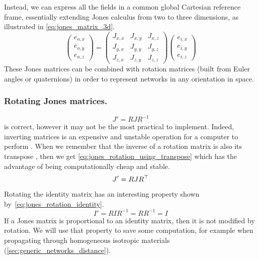 Instead, we can express all the fields in a common global Cartesian reference frame, essentially extending Jones calculus from two to three dimensions, as illustrated in \cref{eq:jones_matrix_3d}.
\begin{equation}
    \begin{pmatrix}
        e_{o, x}\\
        e_{o, y}\\
        e_{o, z}
    \end{pmatrix}
    =
    \begin{pmatrix}
        J_{x, x}   &   J_{x, y}   &   J_{x, z} \\
        J_{y, x}   &   J_{y, y}   &   J_{y, z} \\
        J_{z, x}   &   J_{z, y}   &   J_{z, z}
    \end{pmatrix}
    \begin{pmatrix}
        e_{i, x}\\
        e_{i, y}\\
        e_{i, z}
    \end{pmatrix}
    \label{eq:jones_matrix_3d}
\end{equation}
These Jones matrices can be combined with rotation matrices (built from Euler angles or quaternions) in order to represent networks in any orientation in space.

\subsubsection{Rotating Jones matrices.}
\label{sec:rotating_jones_matrices}
\begin{equation}
    J' = R J R^{-1}
    \label{eq:jones_rotation_using_inverse}
\end{equation}
 is correct, however it may not be the most practical to implement.
Indeed, inverting matrices is an expensive and unstable operation for a computer to perform%
.
When we remember that the inverse of a rotation matrix is also its transpose%
,
then we get \cref{eq:jones_rotation_using_transpose} which has the advantage of being computationally cheap and stable.
\begin{equation}
    J' = R J R^\top
    \label{eq:jones_rotation_using_transpose}
\end{equation}

Rotating the identity matrix has an interesting property shown by~\eqref{eq:jones_rotation_identity}.
\begin{equation}
    I' = R I R^{-1}
       = R R^{-1}
       = I
    \label{eq:jones_rotation_identity}
\end{equation}
If a Jones matrix is proportional to an identity matrix, then it is not modified by rotation.
We will use that property to save some computation, for example when propagating through homogeneous isotropic materials (\vref{sec:generic_networks_distance}).

